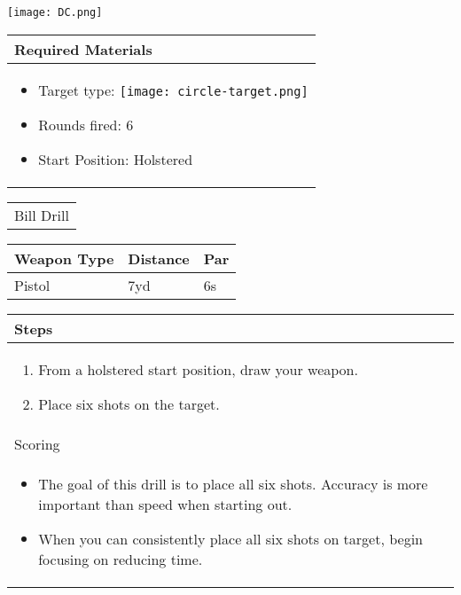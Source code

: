 \documentclass[8pt]{article}
\author{DC Metro Socialist Rifle Association}
\begin{document}
\begin{minipage}[t]{3.5cm} 
	\texttt{[image: DC.png]}
	\begin{tabular}{p{3cm}}
		\small Required Materials \\
		\hline
		\tiny \begin{itemize}[leftmargin=\parindent,align=left,labelwidth=\parindent,labelsep=0pt]
			\item Target type: \texttt{[image: circle-target.png]}
			\item Rounds fired: 6 
			\item Start Position: Holstered
		\end{itemize}				
		\\[5.5cm]
	\end{tabular}
\end{minipage}
\hfill
\begin{minipage}[t]{9.5cm}
	\begin{minipage}[t]{3cm}
		\begin{tabular}{ p{3cm} }			
			\huge Bill Drill\\[1cm]			
		\end{tabular}
	\end{minipage}
	\hfill
	\begin{minipage}[t]{6cm}
		\begin{tabular}{ | p{1.5cm} | p{1cm} | p{1cm} |}
			\hline
			\tiny Weapon Type & \tiny Distance & \tiny Par \\ 
			\hline
			\tiny Pistol & \tiny 7yd & \tiny 6s \\ 
			\hline
		\end{tabular}
	\end{minipage}
	\begin{tabular}{ | p{8.5cm} |}
		\hline
		Steps\\ 
		\hline
		\small \begin{enumerate}[topsep=0pt, partopsep=0pt]
			\item From a holstered start position, draw your weapon.
			\item Place six shots on the target.
		\end{enumerate}		
		\\ [2cm]
		\hline
		Scoring \\
		\hline
		\small \begin{itemize}[topsep=0pt, partopsep=0pt]
			\item The goal of this drill is to place all six shots. Accuracy is more important than speed when starting out.
			\item When you can consistently place all six shots on target, begin focusing on reducing time.
		\end{itemize}		
		\\ [2cm]
		\hline
	\end{tabular}
\end{minipage}
\end{document}

